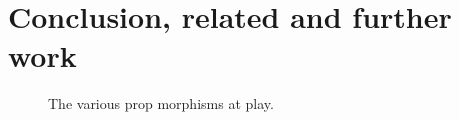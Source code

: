 \section{Conclusion, related and further work}

\begin{figure}
    \centering
    
    \caption{The various prop morphisms at play.}
    \label{fig:roadmap}
\end{figure}